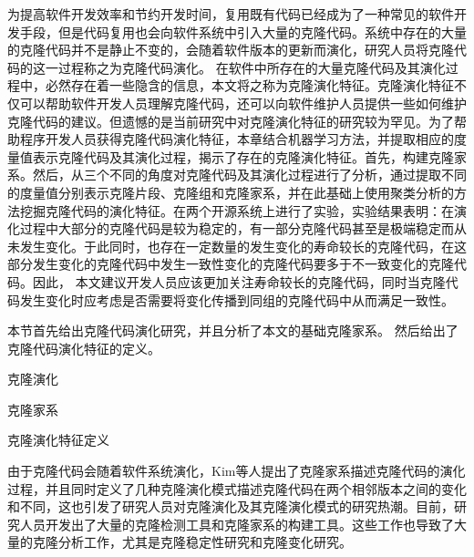 


为提高软件开发效率和节约开发时间，复用既有代码已经成为了一种常见的软件开发手段，但是代码复用也会向软件系统中引入大量的克隆代码。系统中存在的大量的克隆代码并不是静止不变的，会随着软件版本的更新而演化，研究人员将克隆代码的这一过程称之为克隆代码演化。
在软件中所存在的大量克隆代码及其演化过程中，必然存在着一些隐含的信息，本文将之称为克隆演化特征。克隆演化特征不仅可以帮助软件开发人员理解克隆代码，还可以向软件维护人员提供一些如何维护克隆代码的建议。但遗憾的是当前研究中对克隆演化特征的研究较为罕见。为了帮助程序开发人员获得克隆代码演化特征，本章结合机器学习方法，并提取相应的度量值表示克隆代码及其演化过程，揭示了存在的克隆演化特征。首先，构建克隆家系。然后，从三个不同的角度对克隆代码及其演化过程进行了分析，通过提取不同的度量值分别表示克隆片段、克隆组和克隆家系，并在此基础上使用聚类分析的方法挖掘克隆代码的演化特征。在两个开源系统上进行了实验，实验结果表明：在演化过程中大部分的克隆代码是较为稳定的，有一部分克隆代码甚至是极端稳定而从未发生变化。于此同时，也存在一定数量的发生变化的寿命较长的克隆代码，在这部分发生变化的克隆代码中发生一致性变化的克隆代码要多于不一致变化的克隆代码。因此， 本文建议开发人员应该更加关注寿命较长的克隆代码，同时当克隆代码发生变化时应考虑是否需要将变化传播到同组的克隆代码中从而满足一致性。



本节首先给出克隆代码演化研究，并且分析了本文的基础克隆家系。
然后给出了克隆代码演化特征的定义。


克隆演化

克隆家系

克隆演化特征定义


由于克隆代码会随着软件系统演化，Kim等人提出了克隆家系描述克隆代码的演化过程，并且同时定义了几种克隆演化模式描述克隆代码在两个相邻版本之间的变化和不同\cite{kim2005empirical}，这也引发了研究人员对克隆演化及其克隆演化模式的研究热潮。目前，研究人员开发出了大量的克隆检测工具和克隆家系的构建工具。这些工作也导致了大量的克隆分析工作，尤其是克隆稳定性研究和克隆变化研究\cite{inoue2012experience}\cite{krinke2008cloned}。

